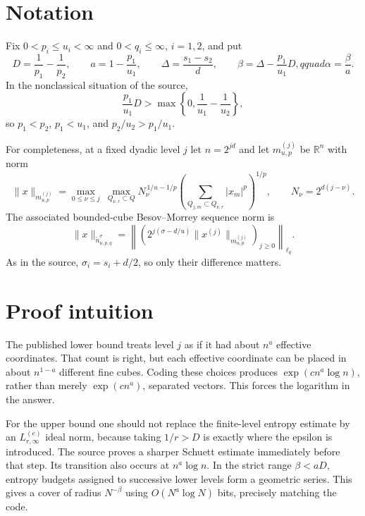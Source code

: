 \documentclass[11pt]{article}
\newcommand{\R}{\mathbb R}
\begin{document}
\section{Notation}

Fix $0<p_i\le u_i<\infty$ and $0<q_i\le\infty$, $i=1,2$, and put
\begin{equation}\label{eq:parameters}
 D=\frac1{p_1}-\frac1{p_2},\qquad
 a=1-\frac{p_1}{u_1},\qquad
 \Delta=\frac{s_1-s_2}{d},\qquad
 \beta=\Delta-\frac{p_1}{u_1}D,qquad
 \alpha=\frac{\beta}{a}.
\end{equation}
In the nonclassical situation of the source,
\begin{equation}\label{eq:nonclassical}
 \frac{p_1}{u_1}D>
 \max\left\{0,\frac1{u_1}-\frac1{u_2}\right\},
\end{equation}
so $p_1<p_2$, $p_1<u_1$, and $p_2/u_2>p_1/u_1$.

For completeness, at a fixed dyadic level $j$ let $n=2^{jd}$ and let
$m^{(j)}_{u,p}$ be $\R^n$ with norm
\begin{equation}\label{eq:blocknorm}
 \|x\|_{m^{(j)}_{u,p}}
 =\max_{0\le\nu\le j}\ \max_{Q_{\nu,r}\subset Q}
 N_{\nu}^{\,1/u-1/p}
 \left(\sum_{Q_{j,m}\subset Q_{\nu,r}}|x_m|^p\right)^{1/p},
 \qquad N_\nu=2^{d(j-\nu)}.
\end{equation}
The associated bounded-cube Besov--Morrey sequence norm is
\begin{equation}\label{eq:fullnorm}
 \|x\|_{\widetilde n^\sigma_{u,p,q}}
 =\left\|\left(
 2^{j(\sigma-d/u)}\|x^{(j)}\|_{m^{(j)}_{u,p}}
 \right)_{j\ge0}\right\|_{\ell_q}.
\end{equation}
As in the source, $\sigma_i=s_i+d/2$, so only their difference matters.

\section{Proof intuition}

The published lower bound treats level $j$ as if it had about $n^a$
effective coordinates.  That count is right, but each effective coordinate
can be placed in about $n^{1-a}$ different fine cubes.  Coding these choices
produces $\exp(cn^a\log n)$, rather than merely $\exp(cn^a)$, separated
vectors.  This forces the logarithm in the answer.

For the upper bound one should not replace the finite-level entropy estimate
by an $L_{r,\infty}^{(e)}$ ideal norm, because taking $1/r>D$ is exactly where
the epsilon is introduced.  The source proves a sharper Schuett estimate
immediately before that step.  Its transition also occurs at
$n^a\log n$.  In the strict range $\beta<aD$, entropy budgets assigned to
successive lower levels form a geometric series.  This gives a cover of
radius $N^{-\beta}$ using $O(N^a\log N)$ bits, precisely matching the code.
\end{document}
